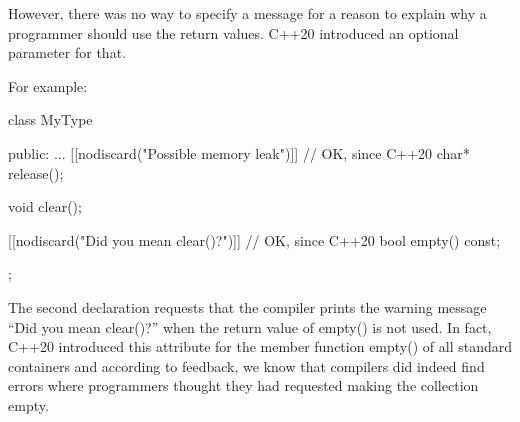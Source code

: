 However, there was no way to specify a message for a reason to explain why a programmer should use the return values. C++20 introduced an optional parameter for that.

For example:

\begin{cpp}
class MyType {
	public:
	...
	[[nodiscard("Possible memory leak")]] // OK, since C++20
	char* release();
	
	void clear();
	
	[[nodiscard("Did you mean clear()?")]] // OK, since C++20
	bool empty() const;
};
\end{cpp}

The second declaration requests that the compiler prints the warning message “Did you mean clear()?” when the return value of empty() is not used. In fact, C++20 introduced this attribute for the member function empty() of all standard containers and according to feedback, we know that compilers did indeed find errors where programmers thought they had requested making the collection empty.



